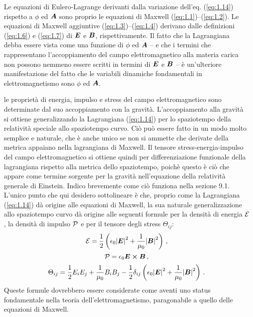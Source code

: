 Le equazioni di Eulero-Lagrange derivanti dalla variazione dell'eq. (\ref{eq:1.14}) rispetto a $\phi$ ed $\vb*{A}$ sono proprio le equazioni di Maxwell (\ref{eq:1.1})--(\ref{eq:1.2}). Le equazioni di Maxwell aggiuntive (\ref{eq:1.3})--(\ref{eq:1.4}) derivano dalle definizioni (\ref{eq:1.6}) e (\ref{eq:1.7}) di $\vb*{E}$ e $\vb*{B}$, rispettivamente. Il fatto che la Lagrangiana debba essere vista come una funzione di $\phi$ ed $\vb*{A}$ -- e che i termini che rappresentano l'accoppiamento del campo elettromagnetico alla materia carica non possono nemmeno essere scritti in termini di $\vb*{E}$ e $\vb*{B}$ -- è un'ulteriore manifestazione del fatto che le variabili dinamiche fondamentali in elettromagnetismo sono $\phi$ ed $\vb*{A}$.

le proprietà di energia, impulso e stress del campo elettromagnetico sono determinate dal suo accoppiamento con la gravità. L'accoppiamento alla gravità si ottiene generalizzando la Lagrangiana (\ref{eq:1.14}) per lo spaziotempo della relatività speciale allo spaziotempo curvo. Ciò può essere fatto in un modo molto semplice e naturale, che è anche unico se non si ammette che derivate della metrica appaiano nella lagrangiana di Maxwell. Il tensore stress-energia-impulso del campo elettromagnetico si ottiene quindi per differenziazione funzionale della lagrangiana rispetto alla metrica dello spaziotempo, poichè questo è ciò che appare come termine sorgente per la gravità nell'equazione della relatività generale di Einstein. Indico brevemente come ciò funziona nella sezione 9.1. L'unico punto che qui desidero sottolineare è che, proprio come la Lagrangiana (\ref{eq:1.14}) dà origine alle equazioni di Maxwell, la sua naturale generalizzazione allo spaziotempo curvo dà origine alle seguenti formule per la densità di energia $\mathcal{E}$, la densità di impulso $\mathcal{P}$ e per il tensore degli stress $\Theta_{ij}$:
\begin{equation}\label{eq:1.15}
\cE = \frac{1}{2} \left(\epsilon_0 {\abs{\vb*{E}}}^2 + \frac{1}{\mu_0} {\abs{\vb*{B}}}^2 \right)\,,
\end{equation}
\begin{equation}\label{eq:1.16}
\cP = \epsilon_0 \vb*{E} \cross \vb*{B}\,,
\end{equation}
\begin{equation}\label{eq:1.17}
\Theta_{ij} =  \frac{1}{2} E_iE_j + \frac{1}{\mu_0} B_iB_j
- \frac{1}{2} \delta_{ij} \left(\epsilon_0 {\abs{\vb*{E}}}^2 + \frac{1}{\mu_0} {\abs{\vb*{B}}}^2 \right)\,.
\end{equation}
Queste formule dovrebbero essere considerate come aventi uno status fondamentale nella teoria dell'elettromagnetismo, paragonabile a quello delle equazioni di Maxwell.
